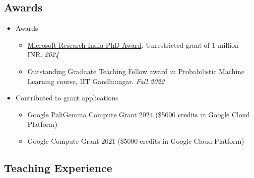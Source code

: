 \documentclass[letter,10pt]{article}
\begin{document}
\subsection*{\sc \textbf{
Awards}\hspace{5pt}\noindent\hrulefill}
\begin{itemize}
    \item[] Awards
    \begin{itemize}
        \item \href{https://www.microsoft.com/en-us/research/academic-program/microsoft-research-india-phd-award-2024/}{Microsoft Research India PhD Award}. Unrestricted grant of 1 million INR. \hfill \textit{2024}
        \item Outstanding Graduate Teaching Fellow award in Probabilistic Machine Learning course, IIT Gandhinagar. \hfill \textit{Fall 2022}
    \end{itemize}
    \item[] Contributed to grant applications
    \begin{itemize}
        \item Google PaliGemma Compute Grant 2024 (\$5000 credits in Google Cloud Platform)
        \item Google Compute Grant 2021 (\$5000 credits in Google Cloud Platform)
    \end{itemize}
    
\end{itemize}







\subsection*{\sc \textbf{Teaching Experience}\hspace{5pt}\noindent\hrulefill}
\end{document}
